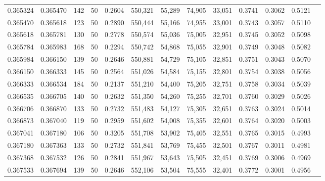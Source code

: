\begin{tabular}{rrrrrrrrrrrrr}
0.365324 & 0.365470 &   142 &  50 &                                     0.2604 & 550,321 &  55,289 &  74,905 &  33,051 & 0.3741 & 0.3062 & 0.5121 \\
0.365470 & 0.365618 &   123 &  50 &                                     0.2890 & 550,444 &  55,166 &  74,955 &  33,001 & 0.3743 & 0.3057 & 0.5110 \\
0.365618 & 0.365781 &   130 &  50 &                                     0.2778 & 550,574 &  55,036 &  75,005 &  32,951 & 0.3745 & 0.3052 & 0.5098 \\
0.365784 & 0.365983 &   168 &  50 &                                     0.2294 & 550,742 &  54,868 &  75,055 &  32,901 & 0.3749 & 0.3048 & 0.5082 \\
0.365984 & 0.366150 &   139 &  50 &                                     0.2646 & 550,881 &  54,729 &  75,105 &  32,851 & 0.3751 & 0.3043 & 0.5070 \\
0.366150 & 0.366333 &   145 &  50 &                                     0.2564 & 551,026 &  54,584 &  75,155 &  32,801 & 0.3754 & 0.3038 & 0.5056 \\
0.366333 & 0.366534 &   184 &  50 &                                     0.2137 & 551,210 &  54,400 &  75,205 &  32,751 & 0.3758 & 0.3034 & 0.5039 \\
0.366535 & 0.366705 &   140 &  50 &                                     0.2632 & 551,350 &  54,260 &  75,255 &  32,701 & 0.3760 & 0.3029 & 0.5026 \\
0.366706 & 0.366870 &   133 &  50 &                                     0.2732 & 551,483 &  54,127 &  75,305 &  32,651 & 0.3763 & 0.3024 & 0.5014 \\
0.366873 & 0.367040 &   119 &  50 &                                     0.2959 & 551,602 &  54,008 &  75,355 &  32,601 & 0.3764 & 0.3020 & 0.5003 \\
0.367041 & 0.367180 &   106 &  50 &                                     0.3205 & 551,708 &  53,902 &  75,405 &  32,551 & 0.3765 & 0.3015 & 0.4993 \\
0.367180 & 0.367363 &   133 &  50 &                                     0.2732 & 551,841 &  53,769 &  75,455 &  32,501 & 0.3767 & 0.3011 & 0.4981 \\
0.367368 & 0.367532 &   126 &  50 &                                     0.2841 & 551,967 &  53,643 &  75,505 &  32,451 & 0.3769 & 0.3006 & 0.4969 \\
0.367533 & 0.367694 &   139 &  50 &                                     0.2646 & 552,106 &  53,504 &  75,555 &  32,401 & 0.3772 & 0.3001 & 0.4956 \\

\end{tabular}
